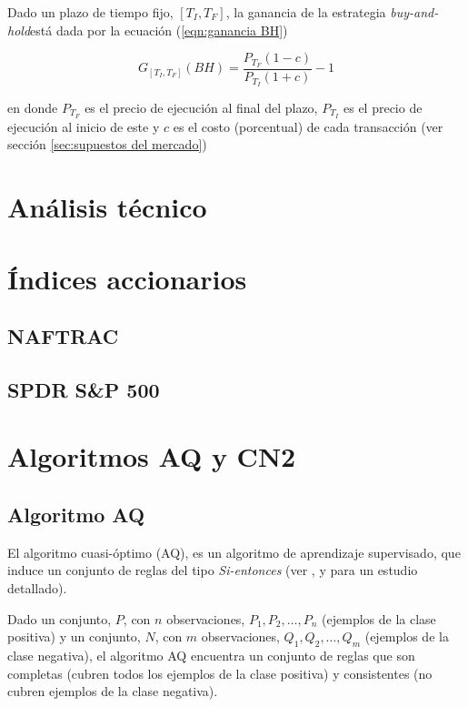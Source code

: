 \documentclass[12pt]{scrbook}
\theoremstyle{break}
\theoremstyle{break}
\newcommand{\buyhold}{\textit{buy-and-hold}}
\begin{document}
Dado un plazo de tiempo fijo, $\left[T_{I}, T_{F}\right]$, la ganancia de la estrategia \buyhold está dada por la ecuación (\ref{eqn:ganancia BH})

\begin{equation} \label{eqn:ganancia BH}
G_{\left[T_{I}, T_{F}\right]} (BH) = \dfrac{P_{T_F} (1 - c) } { P_{T_I} (1 + c) } - 1
\end{equation}

en donde $P_{T_F}$ es el precio de ejecución al final del plazo, $P_{T_I}$ es el precio de ejecución al inicio de este y $c$ es el costo (porcentual) de cada transacción (ver sección \ref{sec:supuestos del mercado})


\section{Análisis técnico}
\label{seccion:analisisTecnico}

\section{Índices accionarios}
\label{seccion:indices accionarios}
\subsection{NAFTRAC}
\label{seccion:naftrac}

\subsection{SPDR S\&P 500}
\label{seccion:sp500}





\section{Algoritmos AQ y CN2}
\label{seccion:algoritmos aq cn2}

\subsection{Algoritmo AQ}
\label{subseccion:algoritmo aq}
El algoritmo cuasi-óptimo (AQ), es un algoritmo de aprendizaje supervisado, que induce un conjunto de reglas del tipo \textit{Si-entonces} (ver \cite{AQCervone2010}, \cite{AQMichalski1991} y \cite{AQWojtusiak2012} para un estudio detallado). 

Dado un conjunto, $P$, con $n$ observaciones, $P_1, P_2, \ldots, P_n$ (ejemplos de la clase positiva)  y un conjunto, $N$, con $m$ observaciones, $Q_1, Q_2, \ldots, Q_m$ (ejemplos de la clase negativa), el algoritmo AQ encuentra un conjunto de reglas que son completas (cubren todos los ejemplos de la clase positiva) y consistentes (no cubren ejemplos de la clase negativa).
\end{document}
